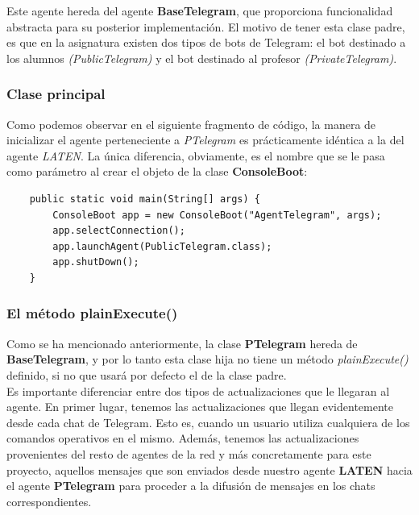 Este agente hereda del agente \textbf{BaseTelegram}, que proporciona funcionalidad abstracta para su posterior implementación. El motivo de tener esta clase padre, es que en la asignatura existen dos tipos de bots de Telegram: el bot destinado a los alumnos \textit{(PublicTelegram)} y el bot destinado al profesor \textit{(PrivateTelegram)}.

\subsubsection{Clase principal}

Como podemos observar en el siguiente fragmento de código, la manera de inicializar el agente perteneciente a \textit{PTelegram} es prácticamente idéntica a la del agente \textit{LATEN}. La única diferencia, obviamente, es el nombre que se le pasa como parámetro al crear el objeto de la clase \textbf{ConsoleBoot}:\\

\begin{lstlisting}
    public static void main(String[] args) {
        ConsoleBoot app = new ConsoleBoot("AgentTelegram", args);
        app.selectConnection();
        app.launchAgent(PublicTelegram.class);
        app.shutDown();
    }
\end{lstlisting}

\subsubsection{El método plainExecute()}

Como se ha mencionado anteriormente, la clase \textbf{PTelegram} hereda de \textbf{BaseTelegram}, y por lo tanto esta clase hija no tiene un método \textit{plainExecute()} definido, si no que usará por defecto el de la clase padre.\\

Es importante diferenciar entre dos tipos de actualizaciones que le llegaran al agente. En primer lugar, tenemos las actualizaciones que llegan evidentemente desde cada chat de Telegram. Esto es, cuando un usuario utiliza cualquiera de los comandos operativos en el mismo. Además, tenemos las actualizaciones provenientes del resto de agentes de la red y más concretamente para este proyecto, aquellos mensajes que son enviados desde nuestro agente \textbf{LATEN} hacia el agente \textbf{PTelegram} para proceder a la difusión de mensajes en los chats correspondientes.\\

